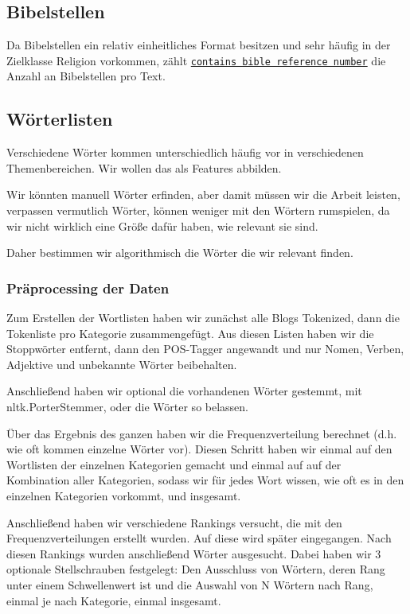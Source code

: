 \documentclass[
	11pt,
	a4paper
]{scrartcl}
\newcommand{\code}[1]{\texttt{\ul{#1}}}
\begin{document}
\subsection{Bibelstellen}\label{bibelstellen}
Da Bibelstellen ein relativ einheitliches Format besitzen und sehr häufig in der Zielklasse Religion vorkommen, zählt \code{contains bible
reference number} die Anzahl an Bibelstellen pro Text.

\subsection{Wörterlisten}\label{woerterlisten}
Verschiedene Wörter kommen unterschiedlich häufig vor in verschiedenen Themenbereichen. Wir wollen das als Features abbilden.

Wir könnten manuell Wörter erfinden, aber damit müssen wir die Arbeit leisten, verpassen vermutlich Wörter, 
können weniger mit den Wörtern rumspielen, da wir nicht wirklich eine Größe dafür haben, wie relevant sie sind.

Daher bestimmen wir algorithmisch die Wörter die wir relevant finden.

\subsubsection{Präprocessing der Daten}

Zum Erstellen der Wortlisten haben wir zunächst alle Blogs Tokenized, dann die Tokenliste pro Kategorie zusammengefügt. 
Aus diesen Listen haben wir die Stoppwörter entfernt, dann den POS-Tagger angewandt und nur Nomen, Verben, Adjektive und unbekannte Wörter beibehalten.

Anschließend haben wir optional die vorhandenen Wörter gestemmt, mit nltk.PorterStemmer, oder die Wörter so belassen. 

Über das Ergebnis des ganzen haben wir die Frequenzverteilung berechnet (d.h. wie oft kommen einzelne Wörter vor). 
Diesen Schritt haben wir einmal auf den Wortlisten der einzelnen Kategorien gemacht und einmal auf auf der Kombination aller Kategorien, 
sodass wir für jedes Wort wissen, wie oft es in den einzelnen Kategorien vorkommt, und insgesamt.

Anschließend haben wir verschiedene Rankings versucht, die mit den Frequenzverteilungen erstellt wurden. 
Auf diese wird später eingegangen. Nach diesen Rankings wurden anschließend Wörter ausgesucht. 
Dabei haben wir 3 optionale Stellschrauben festgelegt: Den Ausschluss von Wörtern, 
deren Rang unter einem Schwellenwert ist und die Auswahl von N Wörtern nach Rang, einmal je nach Kategorie, einmal insgesamt.
\end{document}
